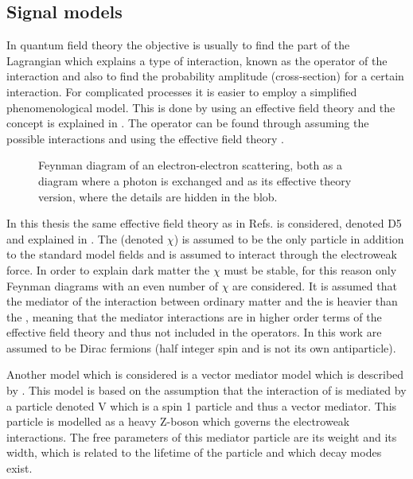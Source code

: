 \subsection{Signal models}\label{sec:tb:subsec:eft}
In quantum field theory the objective is usually to find the part of the Lagrangian which explains a type of interaction, known as the operator of the interaction and also to find the probability amplitude (cross-section) for a certain interaction. For complicated processes it is easier to employ a simplified phenomenological model. This is done by using an effective field theory and the concept is explained in . The operator can be found through assuming the possible interactions and using the effective field theory \citep{Zee:2003}. 
 \begin{figure}[H] %
    \hfill
    \caption{Feynman diagram of an electron-electron scattering, both as a diagram where a photon is exchanged and as its effective theory version, where the details are hidden in the blob.}
    \label{fig:feymanc}
  \end{figure}
In this thesis the same effective field theory as in Refs. \citep{82.116010,Goodman:2010} is considered, denoted D5 and explained in . The \abbrWIMP (denoted $\chi$) is assumed to be the only particle in addition to the standard model fields and is assumed to interact through the electroweak force. In order to explain dark matter the \abbrWIMP $\chi$ must be stable, for this reason only Feynman diagrams with an even number of $\chi$ are considered. It is assumed that the mediator of the interaction between ordinary matter and the \abbrWIMPS is heavier than the \abbrWIMPS, meaning that the mediator interactions are in higher order terms of the effective field theory and thus not included in the operators. In this work \abbrWIMPS are assumed to be Dirac fermions (half integer spin and is not its own antiparticle). 

Another model which is considered is a vector mediator model which is described by . This model is based on the assumption that the interaction of \abbrWIMPS is mediated by a particle denoted V which is a spin 1 particle and thus a vector mediator. This particle is modelled as a heavy Z-boson which governs the electroweak interactions. The free parameters of this mediator particle are its weight and its width, which is related to the lifetime of the particle and which decay modes exist. 

